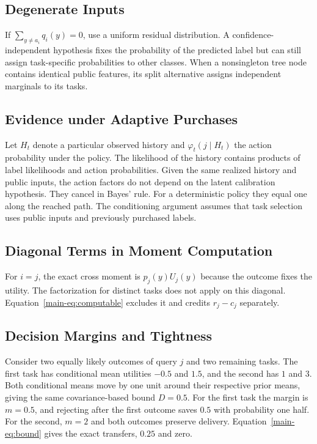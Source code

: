 \documentclass[journal]{IEEEtran}
\begin{document}
\subsection{Degenerate Inputs}
If $\sum_{y\ne a_i}q_i(y)=0$, use a uniform residual distribution. A confidence-independent hypothesis fixes the probability of the predicted label but can still assign task-specific probabilities to other classes. When a nonsingleton tree node contains identical public features, its split alternative assigns independent marginals to its tasks.

\subsection{Evidence under Adaptive Purchases}
Let $H_t$ denote a particular observed history and $\varphi_t(j\mid H_t)$ the action probability under the policy. The likelihood of the history contains products of label likelihoods and action probabilities. Given the same realized history and public inputs, the action factors do not depend on the latent calibration hypothesis. They cancel in Bayes' rule. For a deterministic policy they equal one along the reached path. The conditioning argument assumes that task selection uses public inputs and previously purchased labels.

\subsection{Diagonal Terms in Moment Computation}
For $i=j$, the exact cross moment is $p_j(y)U_j(y)$ because the outcome fixes the utility. The factorization for distinct tasks does not apply on this diagonal. Equation~\eqref{main-eq:computable} excludes it and credits $r_j-c_j$ separately.

\subsection{Decision Margins and Tightness}\label{app:example}
Consider two equally likely outcomes of query $j$ and two remaining tasks. The first task has conditional mean utilities $-0.5$ and $1.5$, and the second has $1$ and $3$. Both conditional means move by one unit around their respective prior means, giving the same covariance-based bound $D=0.5$. For the first task the margin is $m=0.5$, and rejecting after the first outcome saves $0.5$ with probability one half. For the second, $m=2$ and both outcomes preserve delivery. Equation~\eqref{main-eq:bound} gives the exact transfers, $0.25$ and zero.
\end{document}
